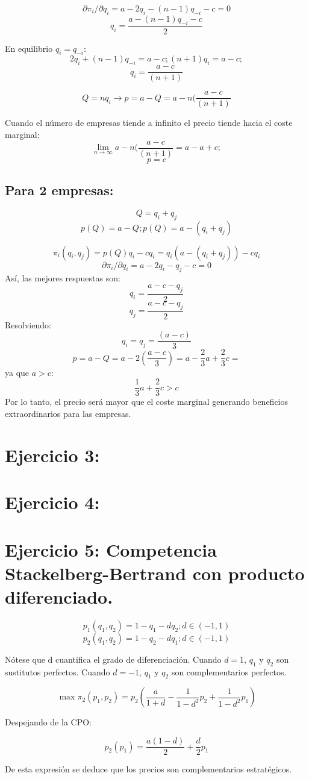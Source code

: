 \documentclass{article}
\theoremstyle{definition}
\theoremstyle{remark}
\begin{document}
$$\partial \pi_i/\partial q_i= a-2q_i-(n-1)q_{-i}-c=0$$
$$q_i=\frac{a-(n-1)q_{-i}-c}{2}$$

En equilibrio $q_i=q_{-i}$:
$$2q_i+(n-1)q_{-i}=a-c; (n+1)q_i=a-c;$$
$$q_i=\frac{a-c}{(n+1)}$$

$$Q=nq_i \rightarrow p=a-Q=a-n(\frac{a-c}{(n+1)}$$

Cuando el n\'umero de empresas tiende a infinito el precio tiende hacia el coste marginal:
$$\lim_{n\rightarrow \infty}a-n(\frac{a-c}{(n+1)}=a-a+c;$$
$$p=c$$

\subsection{Para 2 empresas:}

$$Q=q_i+q_j$$
$$p(Q)=a-Q; p(Q)=a-(q_i+q_j)$$

$$\pi_i(q_i,q_j)=p(Q)q_i-cq_i=q_i(a-(q_i+q_j))-cq_i$$
$$\partial \pi_i/\partial q_i= a-2q_i-q_j-c=0$$
As\'i, las mejores respuestas son:
$$q_i=\frac{a-c-q_j}{2}$$
$$q_j=\frac{a-c-q_j}{2}$$
Resolviendo:
$$q_i=q_j=\frac{(a-c)}{3}$$
$$p=a-Q=a-2(\frac{a-c}{3})=a-\frac{2}{3}a+\frac{2}{3}c=$$
ya que $a>c$:
$$\frac{1}{3}a+\frac{2}{3}c>c$$
Por lo tanto, el precio ser\'a mayor que el coste marginal generando beneficios extraordinarios para las empresas.

\section{Ejercicio 3:}
\section{Ejercicio 4:}
\section{Ejercicio 5: Competencia Stackelberg-Bertrand con producto diferenciado.}
$$p_1(q_1,q_2)=1-q_1-dq_2; d\in(-1,1)$$
$$p_2(q_1,q_2)=1-q_2-dq_1; d\in(-1,1)$$

N\'otese que d cuantifica el grado de diferenciaci\'on. Cuando $d=1$, $q_1$ y $q_2$ son sustitutos perfectos. Cuando  $d=-1$, $q_1$ y $q_2$ son complementarios perfectos.

$$\max\pi_2(p_1,p_2)=p_2(\frac{a}{1+d}-\frac{1}{1-d^2}p_2+\frac{1}{1-d^2}p_1)$$

Despejando de la CPO:

$$p_2(p_1)=\frac{a(1-d)}{2}+\frac{d}{2}p_1$$

De esta expresi\'on se deduce que los precios son complementarios estrat\'egicos.
\end{document}
